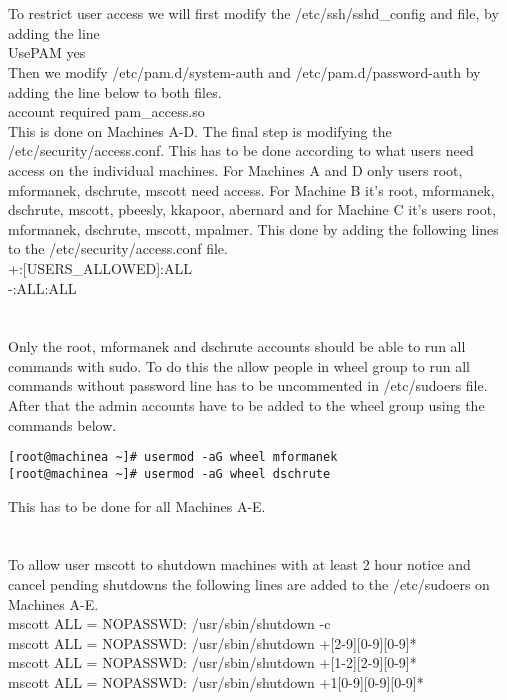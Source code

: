 \documentclass[11pt,onside]{article}
\begin{document}
\section{}
To restrict user access we will first modify the /etc/ssh/sshd\_config and file, by adding the line \\
UsePAM yes \\
Then we modify /etc/pam.d/system-auth and  /etc/pam.d/password-auth
by adding the line below to both files. \\
account     required      pam\_access.so\\
This is done on Machines A-D. The final step is modifying the /etc/security/access.conf. This has to be done according to what users need access on the individual machines. For Machines A and D only users root, mformanek, dschrute, mscott need access. For Machine B it's  root, mformanek, dschrute, mscott, pbeesly, kkapoor, abernard and for Machine C it's users root, mformanek, dschrute, mscott, mpalmer. This done by adding the following lines to the /etc/security/access.conf file. \\
+:[USERS\_ALLOWED]:ALL\\
-:ALL:ALL\\
\section{}
Only the root, mformanek and dschrute accounts should be able to run all commands with sudo. To do this the allow people in wheel group to run all commands without password line has to be uncommented in /etc/sudoers file. After that the admin accounts have to be added to the wheel group using the commands below.
\begin{lstlisting}
[root@machinea ~]# usermod -aG wheel mformanek
[root@machinea ~]# usermod -aG wheel dschrute
\end{lstlisting}
This has to be done for all Machines A-E.
\section{}
To allow user mscott to shutdown machines with at least 2 hour notice and cancel pending shutdowns the following lines are added to the /etc/sudoers on Machines A-E. \\
mscott ALL = NOPASSWD: /usr/sbin/shutdown -c \\
mscott ALL = NOPASSWD: /usr/sbin/shutdown +[2-9][0-9][0-9]* \\
mscott ALL = NOPASSWD: /usr/sbin/shutdown +[1-2][2-9][0-9]* \\
mscott ALL = NOPASSWD: /usr/sbin/shutdown +1[0-9][0-9][0-9]* \\
\end{document}
